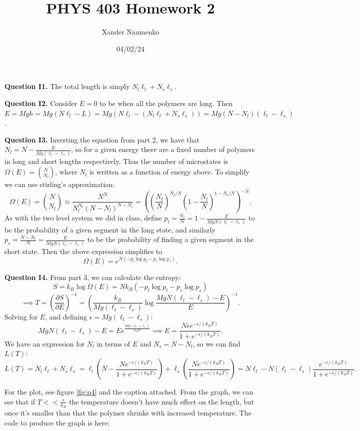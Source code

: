 \documentclass[letterpaper, reqno,11pt]{article}
\begin{document}
\title{PHYS 403 Homework 2}
\date{04/02/24}
\author{Xander Naumenko}
\maketitle

{\medskip\noindent\bf Question I1.} The total length is simply $N_l \ell_l+N_s \ell_s$.

{\medskip\noindent\bf Question I2.} Consider $E=0$ to be when all the polymers are long. Then $E=Mgh=Mg(N\ell_l-L)=Mg(N\ell_l-(N_l\ell_l+N_s\ell_s))=Mg(N-N_l)(\ell_l-\ell_s)$.

{\medskip\noindent\bf Question I3.} Inverting the equation from part 2, we have that $N_l=N- \frac{E}{Mg(\ell_l-\ell_s)}$, so for a given energy there are a fixed number of polymers in long and short lengths respectively. Thus the number of microstates is $\Omega(E)={N\choose N_l}$, where $N_l$ is written as a function of energy above. To simplify we can use stirling's approximation:
\[
    \Omega(E)={N\choose N_l}\approx \frac{N^N}{N_l^{N_l}(N-N_l)^{N-N_l}}=\left( \left( \frac{N_l}{N} \right)^{N_l /N} \left( 1- \frac{N_l}{N} \right) ^{1- N_l /N} \right)^{-N}
.\]
As with the two level system we did in class, define $p_l=\frac{N_l}{N}=1-\frac{E}{MgN(\ell_l-\ell_s)}$ to be the probability of a given segment in the long state, and similarly $p_s=\frac{N-N_l}{N}=\frac{E}{MgN(\ell_l-\ell_s)}$ to be the probability of finding a given segment in the short state. Then the above expression simplifies to
\[
\Omega(E)= e^{N\left( -p_l\log p_l-p_s\log p_s \right) }
.\]

{\medskip\noindent\bf Question I4.} From part 3, we can calculate the entropy:
\[
S=k_B\log\Omega(E)=Nk_B\left( -p_l\log p_l-p_s\log p_s \right) 
\]
\[
    \implies T= \left( \frac{\partial S}{\partial E} \right) ^{-1}=\left(\frac{k_B}{Mg(\ell_l-\ell_s)}\log \frac{MgN(\ell_l-\ell_s)-E}{E}\right)^{-1}
.\]
Solving for $E$, and defining $\epsilon=Mg(\ell_l-\ell_s)$:
\[
    MgN(\ell_l-\ell_s)-E=Ee^{\frac{Mg(\ell_l-\ell_s)}{k_BT}}\implies E= \frac{N\epsilon e^{-\epsilon /(k_BT)}}{1+e^{-\epsilon /(k_BT)}}
.\]
We have an expression for $N_l$ in terms of $E$ and $N_s=N-N_l$, so we can find $L(T)$:
\[
L(T)=N_l\ell_l+N_s\ell_s=\ell_l\left(N-\frac{N e^{-\epsilon /(k_BT)}}{1+e^{-\epsilon /(k_BT)}}\right)+\ell_s\left( \frac{N e^{-\epsilon /(k_BT)}}{1+e^{-\epsilon /(k_BT)}} \right) =N\ell_l-N(\ell_l-\ell_s)\frac{e^{-\epsilon /(k_BT)}}{1+e^{-\epsilon /(k_BT)}}
.\]

For the plot, see figure \ref{fig:q4} and the caption attached. From the graph, we can see that if $T<<\frac{\epsilon}{k_B}$ the temperature doesn't have much effect on the length, but once it's smaller than that the polymer shrinks with increased temperature. The code to produce the graph is here:
\end{document}
